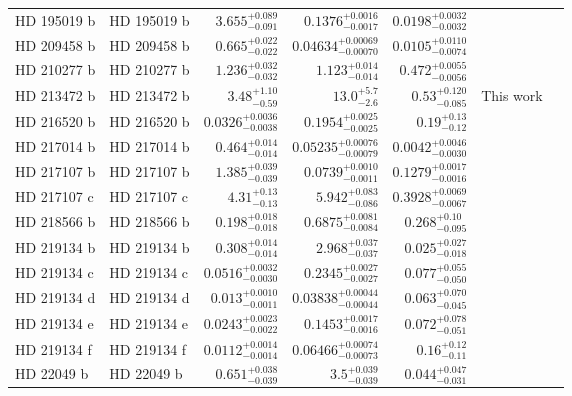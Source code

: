 \begin{longtable*}{llrrrrr}
HD 195019 b & HD 195019 b & $3.655^{+0.089}_{-0.091}$ & $0.1376^{+0.0016}_{-0.0017}$ & $0.0198^{+0.0032}_{-0.0032}$ & \cite{Fischer99} & \\ 
HD 209458 b & HD 209458 b & $0.665^{+0.022}_{-0.022}$ & $0.04634^{+0.00069}_{-0.00070}$ & $0.0105^{+0.0110}_{-0.0074}$ & \cite{Henry00} & \\ 
HD 210277 b & HD 210277 b & $1.236^{+0.032}_{-0.032}$ & $1.123^{+0.014}_{-0.014}$ & $0.472^{+0.0055}_{-0.0056}$ & \cite{Marcy99} & \\ 
HD 213472 b & HD 213472 b & $3.48^{+1.10}_{-0.59}$ & $13.0^{+5.7}_{-2.6}$ & $0.53^{+0.120}_{-0.085}$ & This work & \\ 
HD 216520 b & HD 216520 b & $0.0326^{+0.0036}_{-0.0038}$ & $0.1954^{+0.0025}_{-0.0025}$ & $0.19^{+0.13}_{-0.12}$ & \cite{Burt et al. in prep} & \\ 
HD 217014 b & HD 217014 b & $0.464^{+0.014}_{-0.014}$ & $0.05235^{+0.00076}_{-0.00079}$ & $0.0042^{+0.0046}_{-0.0030}$ & \cite{Mayor95} & \\ 
HD 217107 b & HD 217107 b & $1.385^{+0.039}_{-0.039}$ & $0.0739^{+0.0010}_{-0.0011}$ & $0.1279^{+0.0017}_{-0.0016}$ & \cite{Vogt05} & \\ 
HD 217107 c & HD 217107 c & $4.31^{+0.13}_{-0.13}$ & $5.942^{+0.083}_{-0.086}$ & $0.3928^{+0.0069}_{-0.0067}$ & \cite{Vogt05} & \\ 
HD 218566 b & HD 218566 b & $0.198^{+0.018}_{-0.018}$ & $0.6875^{+0.0081}_{-0.0084}$ & $0.268^{+0.10}_{-0.095}$ & \cite{Meschiari11} & \\ 
HD 219134 b & HD 219134 b & $0.308^{+0.014}_{-0.014}$ & $2.968^{+0.037}_{-0.037}$ & $0.025^{+0.027}_{-0.018}$ & \cite{Vogt15} & \\ 
HD 219134 c & HD 219134 c & $0.0516^{+0.0032}_{-0.0030}$ & $0.2345^{+0.0027}_{-0.0027}$ & $0.077^{+0.055}_{-0.050}$ & \cite{Vogt15} & \\ 
HD 219134 d & HD 219134 d & $0.013^{+0.0010}_{-0.0011}$ & $0.03838^{+0.00044}_{-0.00044}$ & $0.063^{+0.070}_{-0.045}$ & \cite{Vogt15} & \\ 
HD 219134 e & HD 219134 e & $0.0243^{+0.0023}_{-0.0022}$ & $0.1453^{+0.0017}_{-0.0016}$ & $0.072^{+0.078}_{-0.051}$ & \cite{Vogt15} & \\ 
HD 219134 f & HD 219134 f & $0.0112^{+0.0014}_{-0.0014}$ & $0.06466^{+0.00074}_{-0.00073}$ & $0.16^{+0.12}_{-0.11}$ & \cite{Vogt15} & \\ 
HD 22049 b & HD 22049 b & $0.651^{+0.038}_{-0.039}$ & $3.5^{+0.039}_{-0.039}$ & $0.044^{+0.047}_{-0.031}$ & \cite{Hatzes00} & \\ 

\end{longtable*}
